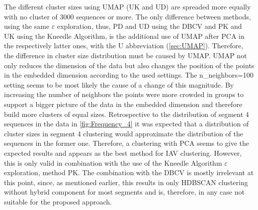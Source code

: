 The different cluster sizes using \gls{UMAP} (UK and UD) are spreaded more equally with no cluster of 3000 sequences or more. The only difference between methods, using the same $\varepsilon$ exploration, thus, PD and UD using the \gls{DBCV} and PK and UK using the Kneedle Algorithm, is the additional use of \gls{UMAP} after \gls{PCA} in the respectively latter ones, with the U abbreviation (\autoref{sec:UMAP}). Therefore, the difference in cluster size distribution must be caused by \gls{UMAP}. \gls{UMAP} not only reduces the dimension of the data but also changes the position of the points in the embedded dimension according to the used settings. The \colorbox{backcolour}{n\_neighbors=100} setting seems to be most likely the cause of a change of this magnitude. By increasing the number of neighbors the points were more crowded in groups to support a bigger picture of the data in the embedded dimension and therefore build more clusters of equal sizes. Retrospective to the distribution of segment 4 sequences in the data in \autoref{fig:Frequency_4} it was expected that a distribution of cluster sizes in segment 4 clustering would approximate the distribution of the sequences in the former one. Therefore, a clustering with \gls{PCA} seems to give the expected results and appears as the best method for \gls{IAV} clustering. However, this is only valid in combination with the use of the Kneedle Algorithm $\varepsilon$ exploration, method PK. The combination with the \gls{DBCV} is mostly irrelevant at this point, since, as mentioned earlier, this results in only \gls{HDBSCAN} clustering without hybrid component for most segments and is, therefore, in any case not suitable for the proposed approach. 



